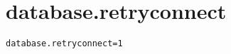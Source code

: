 \section{database.retryconnect}
\label{configuration:DatabaseRetryconnect}
\ClearAPI
\TODO
{}
\begin{lstlisting}[style=Props,caption={Usage example for \textit{database.retryconnect}}]
database.retryconnect=1
\end{lstlisting}